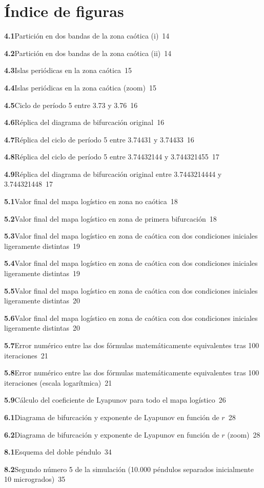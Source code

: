 \documentclass[
  10pt,
  a4paper,
  DIV=11,
  numbers=noendperiod,
  open=any]{scrreprt}
\numberwithin{equation}{chapter}
\numberwithin{equation}{section}
\renewcommand{\[}{\begin{equation}}
\renewcommand{\]}{\end{equation}}
\begin{document}
\chapter*{Índice de figuras}

\begingroup
\parindent=0pt
\setlength{\parskip}{0.35em}
\newcommand{\figline}[3]{\noindent\textbf{#1}\;#2\dotfill\ #3\par}

\figline{4.1}{Partición en dos bandas de la zona caótica (i)}{14}
\figline{4.2}{Partición en dos bandas de la zona caótica (ii)}{14}
\figline{4.3}{Islas periódicas en la zona caótica}{15}
\figline{4.4}{Islas periódicas en la zona caótica (zoom)}{15}
\figline{4.5}{Ciclo de período 5 entre 3.73 y 3.76}{16}
\figline{4.6}{Réplica del diagrama de bifurcación original}{16}
\figline{4.7}{Réplica del ciclo de período 5 entre 3.74431 y 3.74433}{16}
\figline{4.8}{Réplica del ciclo de período 5 entre 3.74432144 y 3.744321455}{17}
\figline{4.9}{Réplica del diagrama de bifurcación original entre 3.7443214444 y 3.744321448}{17}

\figline{5.1}{Valor final del mapa logístico en zona no caótica}{18}
\figline{5.2}{Valor final del mapa logístico en zona de primera bifurcación}{18}
\figline{5.3}{Valor final del mapa logístico en zona de caótica con dos condiciones iniciales ligeramente distintas}{19}
\figline{5.4}{Valor final del mapa logístico en zona de caótica con dos condiciones iniciales ligeramente distintas}{19}
\figline{5.5}{Valor final del mapa logístico en zona de caótica con dos condiciones iniciales ligeramente distintas}{20}
\figline{5.6}{Valor final del mapa logístico en zona de caótica con dos condiciones iniciales ligeramente distintas}{20}
\figline{5.7}{Error numérico entre las dos fórmulas matemáticamente equivalentes tras 100 iteraciones}{21}
\figline{5.8}{Error numérico entre las dos fórmulas matemáticamente equivalentes tras 100 iteraciones (escala logarítmica)}{21}
\figline{5.9}{Cálculo del coeficiente de Lyapunov para todo el mapa logístico}{26}

\figline{6.1}{Diagrama de bifurcación y exponente de Lyapunov en función de $r$}{28}
\figline{6.2}{Diagrama de bifurcación y exponente de Lyapunov en función de $r$ (zoom)}{28}

\figline{8.1}{Esquema del doble péndulo}{34}
\figline{8.2}{Segundo número 5 de la simulación (10.000 péndulos separados inicialmente 10 microgrados)}{35}
\end{document}
